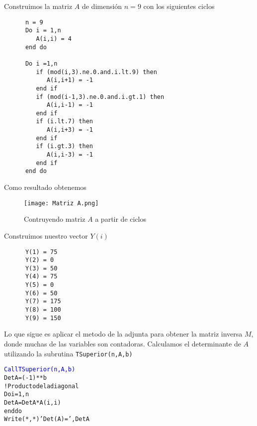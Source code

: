 \documentclass[a4paper]{scrartcl}
\begin{document}
Construimos la matriz $A$ de dimensión $n=9$ con los siguientes ciclos
\begin{verbatim}
      n = 9
      Do i = 1,n
         A(i,i) = 4
      end do

      Do i =1,n
         if (mod(i,3).ne.0.and.i.lt.9) then
            A(i,i+1) = -1
         end if
         if (mod(i-1,3).ne.0.and.i.gt.1) then
            A(i,i-1) = -1
         end if
         if (i.lt.7) then
            A(i,i+3) = -1
         end if
         if (i.gt.3) then
            A(i,i-3) = -1
         end if
      end do
\end{verbatim}
Como resultado obtenemos
\begin{figure}[h!]
    \centering
    \texttt{[image: Matriz A.png]}
    \caption{Contruyendo matriz $A$ a partir de ciclos}
    \label{Matriz A}
\end{figure}

Construimos nuestro vector $Y(i)$
\begin{verbatim}
      Y(1) = 75
      Y(2) = 0
      Y(3) = 50
      Y(4) = 75
      Y(5) = 0
      Y(6) = 50
      Y(7) = 175
      Y(8) = 100
      Y(9) = 150
\end{verbatim}
Lo que sigue es aplicar el metodo de la adjunta para obtener la matriz inversa $M$, donde muchas de las variables son contadoras. Calculamos el determinante de $A$ utilizando la subrutina \texttt{TSuperior(n,A,b)} \begin{alltt}
      \textcolor{blue}{Call TSuperior(n,A,b)}
      DetA = (-1)**b
      !Producto de la diagonal
      Do i = 1, n
         DetA = DetA*A(i,i)
      end do
      Write(*,*) ' Det(A) =',DetA
\end{alltt}
\end{document}
